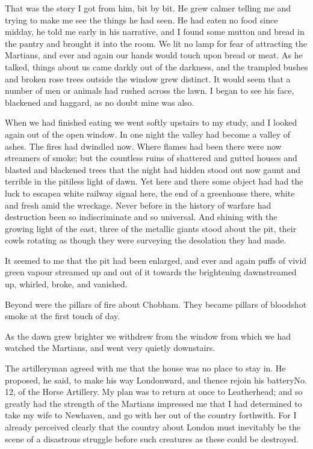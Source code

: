 That was the story I got from him, bit by bit. He grew calmer
telling me and trying to make me see the things he had seen. He had
eaten no food since midday, he told me early in his narrative, and
I found some mutton and bread in the pantry and brought it into the
room. We lit no lamp for fear of attracting the Martians, and ever
and again our hands would touch upon bread or meat. As he talked,
things about us came darkly out of the darkness, and the trampled
bushes and broken rose trees outside the window grew distinct. It
would seem that a number of men or animals had rushed across the
lawn. I began to see his face, blackened and haggard, as no doubt
mine was also.

When we had finished eating we went softly upstairs to my study,
and I looked again out of the open window. In one night the valley
had become a valley of ashes. The fires had dwindled now. Where
flames had been there were now streamers of smoke; but the
countless ruins of shattered and gutted houses and blasted and
blackened trees that the night had hidden stood out now gaunt and
terrible in the pitiless light of dawn. Yet here and there some
object had had the luck to escape\dash{}a white railway signal here, the
end of a greenhouse there, white and fresh amid the wreckage. Never
before in the history of warfare had destruction been so
indiscriminate and so universal. And shining with the growing light
of the east, three of the metallic giants stood about the pit,
their cowls rotating as though they were surveying the desolation
they had made.

It seemed to me that the pit had been enlarged, and ever and again
puffs of vivid green vapour streamed up and out of it towards the
brightening dawn\dash{}streamed up, whirled, broke, and vanished.

Beyond were the pillars of fire about Chobham. They became pillars
of bloodshot smoke at the first touch of day.

As the dawn grew brighter we withdrew from the window from which we
had watched the Martians, and went very quietly downstairs.

The artilleryman agreed with me that the house was no place to stay
in. He proposed, he said, to make his way Londonward, and thence
rejoin his battery\dash{}No. 12, of the Horse Artillery. My plan was to
return at once to Leatherhead; and so greatly had the strength of
the Martians impressed me that I had determined to take my wife to
Newhaven, and go with her out of the country forthwith. For I
already perceived clearly that the country about London must
inevitably be the scene of a disastrous struggle before such
creatures as these could be destroyed.

